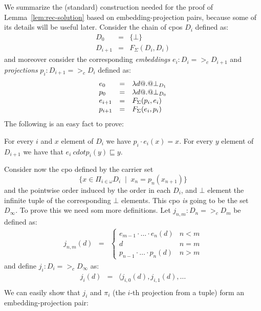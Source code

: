 \documentclass[preprint,nocopyrightspace,draft]{sigplanconf}
\begin{document}
We summarize the (standard) construction needed for the proof of Lemma~\ref{lem:rec-solution} based on embedding-projection pairs, 
because some of its details will be useful later. Consider the chain of cpos $D_i$ defined as: 
\[\begin{array}{lcl}
   D_0 & = & \{\bot\} \\ 
   D_{i+1} & = & F_{\Sigma}(D_i,D_i)
\end{array}\]
and moreover consider the corresponding {\em embeddings} $e_i : D_i =>_c D_{i+1}$ and 
{\em projections} $p_i : D_{i+1} =>_c D_i$ defined as:
\[\begin{array}{lcl}
   e_0 & = & \mathsf{\lambda} d @.@ \bot_{D_1} \\
   p_0 & = & \mathsf{\lambda} d @.@ \bot_{D_0} \\
   e_{i+1} & = & F_{\Sigma}(p_i,e_i) \\
   p_{i+1} & = & F_{\Sigma}(e_i,p_i)
\end{array}\]
The following is an easy fact to prove:
\begin{lemma}
For every $i$ and $x$ element of $D_i$ we have $p_i\cdot e_i(x) = x$. For
every $y$ element of $D_{i+1}$ we have that $e_i\ cdot p_i(y) \sqsubseteq y$. 
\end{lemma}
Consider now the cpo defined by the carrier set 
   \[ \{ x \in \Pi_{i \in \omega}D_i \;\mid\; x_n = p_n(x_{n+1}) \} \] 
and the pointwise order induced by the order in each $D_i$, and $\bot$ element the 
infinite tuple of the corresponding $\bot$ elements. This cpo {\em is} going to be the 
set $D_{\infty}$. To prove this we need som more definitions. Let $j_{n,m} : D_n =>_c D_m$ 
be defined as:
\[\begin{array}{lcl}
   j_{n,m}(d) & = & \left\{\begin{array}{ll} 
                             e_{m-1}\cdot\ldots \cdot e_n(d) & n < m \\
                             d                        & n = m \\
                             p_{n-1}\cdot\ldots \cdot p_n(d) & n > m 
                          \end{array}\right.
\end{array}\]
and define $j_i : D_i =>_c D_\infty$ as:
\[\begin{array}{lcl}
   j_i(d) & = & \langle j_{i,0}(d),j_{i,1}(d),\ldots \\
\end{array}\]
We can easily show that $j_i$ and $\pi_i$ (the $i$-th projection from a tuple) form
an embedding-projection pair:
\end{document}
